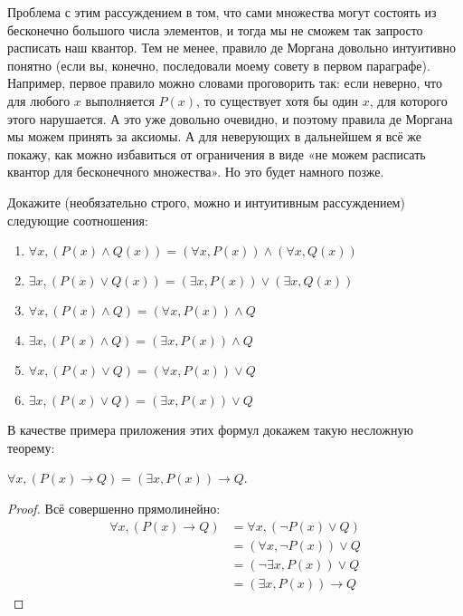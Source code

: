 Проблема с этим рассуждением в том, что сами множества могут состоять из бесконечно большого числа элементов, и тогда мы не сможем так запросто расписать наш квантор. Тем не менее, правило де Моргана довольно интуитивно понятно \mbox{(если} вы, конечно, последовали моему совету в первом параграфе). Например, первое правило можно словами проговорить так: \mbox{если} неверно, что для любого $x$ выполняется $P(x)$, то существует хотя бы один $x$, для которого этого нарушается. А это уже \mbox{довольно} очевидно, и поэтому правила де Моргана мы можем принять за аксиомы. А для неверующих в дальнейшем я всё же покажу, как можно избавиться от ограничения в виде «не можем расписать квантор для бесконечного множества». Но это будет намного \mbox{позже.}


\begin{exercise} Докажите (необязательно строго, можно и интуитивным рассуждением) следующие соотношения:
\begin{enumerate}
\item   $\forall x, (P(x) \wedge Q(x)) = (\forall x, P(x))\wedge (\forall x, Q(x))$
\item   $\exists x, (P(x) \vee Q(x)) = (\exists x, P(x))\vee (\exists x, Q(x))$
\item   $\forall x, (P(x) \wedge Q) = (\forall x, P(x))\wedge Q$
\item   $\exists x, (P(x) \wedge Q) = (\exists x, P(x))\wedge Q$
\item   $\forall x, (P(x) \vee Q) = (\forall x, P(x))\vee Q$
\item   $\exists x, (P(x) \vee Q) = (\exists x, P(x))\vee Q$
\end{enumerate}
\end{exercise}

В качестве примера приложения этих формул докажем такую несложную теорему:

\begin{thm}$\forall x, (P(x)\to Q) = (\exists x, P(x))\to Q$.\end{thm}
\begin{proof}Всё совершенно прямолинейно:
\begin{align*}
\forall x, (P(x)\rightarrow Q) &= \forall x, (\neg P(x) \vee Q)  \\
                               &= (\forall x, \neg P(x)) \vee Q  \\
                               &= (\neg\exists x, P(x))\vee Q    \\
                               &= (\exists x, P(x))\rightarrow Q
\end{align*}
\end{proof}

